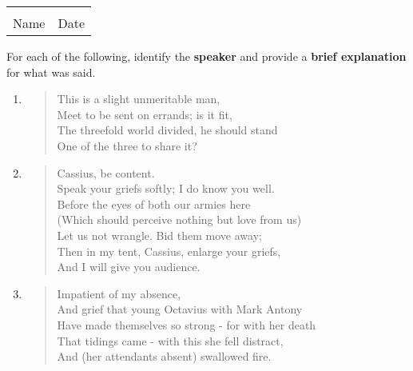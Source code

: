 \documentclass[12pt]{article} %
\begin{document}
  \vspace*{0.4cm}

	\begin{center}
	\noindent\begin{tabular}{ll}
		\makebox[3in]{\hrulefill} & \makebox[3in]{\hrulefill}\\
		Name & Date\\[8ex]%
	\end{tabular}
	\end{center}
	\newpage


\begin{qstn}
  For each of the following, identify the \textbf{speaker} and provide a \textbf{brief explanation} for what was said.

  \begin{enumerate}
    \item
        \begin{verse}
          This is a slight unmeritable man,\\
          Meet to be sent on errands; is it fit,\\
          The threefold world divided, he should stand \\
          One of the three to share it?
        \end{verse}
       \vspace*{7cm}
    \item
       \begin{verse}
         Cassius, be content.\\
         Speak your griefs softly; I do know you well.\\
         Before the eyes of both our armies here\\
         (Which should perceive nothing but love from us)\\
         Let us not wrangle. Bid them move away;\\
         Then in my tent, Cassius, enlarge your griefs,\\
         And I will give you audience.
       \end{verse}
          \newpage

    \item
        \begin{verse}
          Impatient of my absence,\\
          And grief that young Octavius with Mark Antony\\
          Have made themselves so strong - for with her death\\
          That tidings came - with this she fell distract,\\
          And (her attendants absent) swallowed fire.
        \end{verse}
  \end{enumerate}


\end{qstn}
\end{document}
